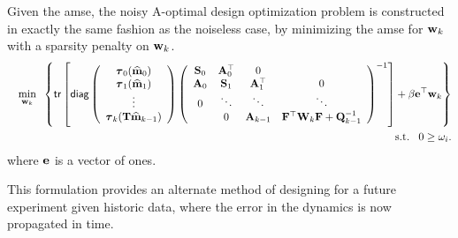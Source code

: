 \documentclass[11pt]{article}
\newcommand{\bfA}	{{\bf{A}}}
\newcommand{\bfF}	{{\bf{F}}}
\newcommand{\bfQ}	{{\bf{Q}}}
\newcommand{\bfS}	{{\bf{S}}}
\newcommand{\bfT}	{{\bf{T}}}
\newcommand{\bfW}	{{\bf{W}}}
\newcommand{\bfd}	{{\bf{d}}}
\newcommand{\bfe}	{{\bf{e}}}
\newcommand{\bfm}	{{\bf{m}}}
\newcommand{\bfw}	{{\bf{w}}}
\newcommand{\hf}        {{\frac 12}}
\newcommand{\bfPhi}     {{\boldsymbol \Phi}}
\newcommand{\bftau}      {{\boldsymbol \tau}}
\renewcommand{\hf}		 {\frac12}
\newcommand{\bfmhat}    {{\widehat{\bfm}}}
\begin{document}
Given the {\sf amse}, the noisy A-optimal design optimization problem is constructed in exactly the same fashion as the  noiseless case, by minimizing the {\sf amse} for $\bfw_k$ with a sparsity penalty on $\bfw_k$. 
\begin{eqnarray*}
\label{eq:noisyOpt}
 &&\min_{\bfw_k}\;\; \left\{{\sf tr} \left[{\sf diag}\left( \begin{array}{c}
\bftau_0(\bfmhat_0) \\ 
\bftau_1(\bfmhat_1)  \\
\vdots \\
\bftau_k(\bfT\bfmhat_{k-1})\end{array}\right)
\left(\begin{array}{cccc}
 \bfS_0 &  \bfA^{\top}_0 & 0 & \\
 \bfA_0 & \bfS_1 & \bfA^{\top}_1 & 0 \\
 0 & \ddots & \ddots & \ddots \\
 & 0 & \bfA_{k-1} &  \bfF^{\top}\bfW_{k}\bfF + \bfQ^{-1}_{k-1} 
  \end{array}\right)^{-1}\right] + \beta \bfe^{\top}\bfw_k \right\}\\
 &&\text{ s.t.} \;\;\;0 \geq \omega_i.
\end{eqnarray*}
where $\bfe$ is a vector of ones.

This formulation provides an alternate method of designing for a future experiment given historic data, where the error in the dynamics is now propagated in time.
% 

%
\end{document}
